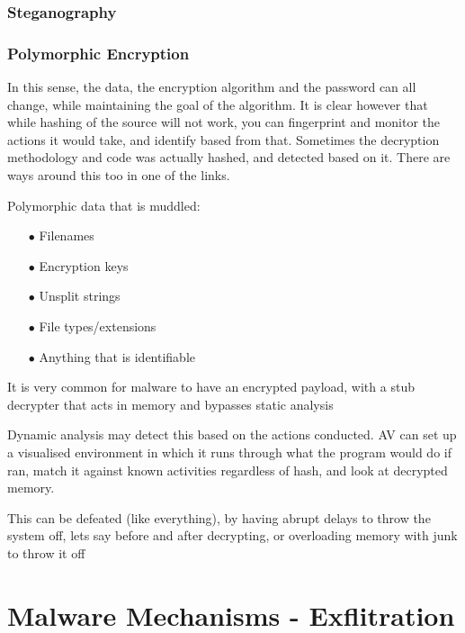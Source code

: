\subsection{Steganography}

\subsection{Polymorphic Encryption}
In this sense, the data, the encryption algorithm and the password can all change, while maintaining the goal of the algorithm.
It is clear however that while hashing of the source will not work, you can fingerprint and monitor the actions it would take, and identify based from that.
Sometimes the decryption methodology and code was actually hashed, and detected based on it. There are ways around this too in one of the links.

Polymorphic data that is muddled:
\begin{enumerate}
    \item [$\bullet$]Filenames
    \item [$\bullet$]Encryption keys
    \item [$\bullet$]Unsplit strings
    \item [$\bullet$]File types/extensions
    \item [$\bullet$]Anything that is identifiable
\end{enumerate}

It is very common for malware to have an encrypted payload, with a stub decrypter that acts in memory and bypasses static analysis

Dynamic analysis may detect this based on the actions conducted. AV can set up a visualised environment in which it runs through what the program would do if ran, match it against 
known activities regardless of hash, and look at decrypted memory.

This can be defeated (like everything), by having abrupt delays to throw the system off, lets say before and after decrypting, or overloading memory with junk to throw it off


\chapter{Malware Mechanisms - Exflitration}
